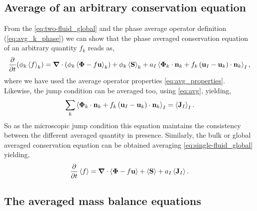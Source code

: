 \subsection{Average of an arbitrary conservation equation}

From the \ref{eq:two-fluid_global} and the phase average operator definition (\ref{eq:avg_k_phase}) we can show that the phase averaged conservation equation of an arbitrary quantity $f_k$ reads as, 
\begin{equation}
    \frac{\partial}{\partial t} (\phi_k\left<f\right>_k)
    = \bm{\nabla} \cdot \left(
        \phi_k \left<\bm{\Phi} - f \textbf{u}\right>_k
    \right)
    + \phi_k \left<\textbf{S}\right>_k
    + a_I \left<
        \bm{\Phi}_k \cdot \textbf{n}_k
        + f_k 
        \left(
            \textbf{u}_I
            - \textbf{u}_k
        \right) \cdot \textbf{n}_k
    \right>_I,
    \label{eq:avg_k_global}
\end{equation}
where we have used the average operator properties \ref{eq:avg_properties}.
Likewise, the jump condition can be averaged too, using \ref{eq:avg}, yielding,
\begin{equation}
    \sum_k 
    \left<
        \bm{\Phi}_k 
        \cdot \textbf{n}_k
        + f_k 
        \left(
            \textbf{u}_I
            - \textbf{u}_k
        \right) 
        \cdot \textbf{n}_k
    \right>_I
    = \left<\textbf{J}_I\right>_I.
    \label{eq:avg_general_jump}
\end{equation}
So as the microscopic jump condition this equation maintains the consistency between the different averaged quantity in presence. 
Similarly, the bulk or global averaged conservation equation can be obtained averaging \ref{eq:single-fluid_global} yielding,
\begin{equation*}
    \frac{\partial}{\partial t} \left<f\right>
    = \bm{\nabla} \cdot \left<\bm{\Phi} - f \textbf{u}\right>
    + \left<\textbf{S}\right>
    + a_I\left<\textbf{J}_I\right>.
    \label{eq:avg_global}
\end{equation*}


\subsection{The averaged mass balance equations}

